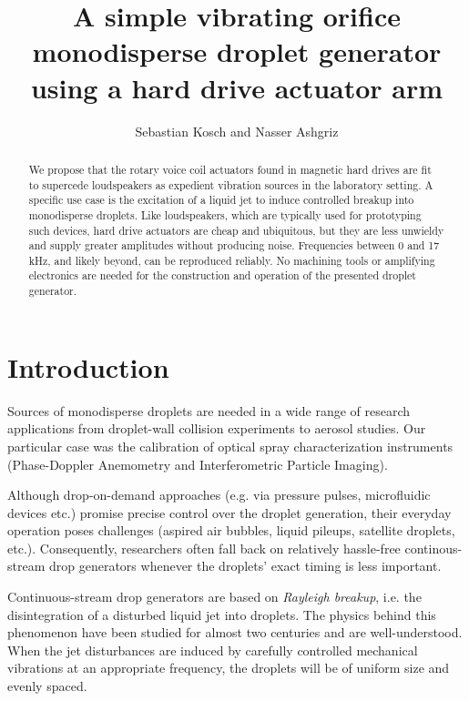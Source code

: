 \documentclass[aip,rsi,reprint,graphicx]{revtex4-1} %
\begin{document}
\title{A simple vibrating orifice monodisperse droplet generator using a hard
drive actuator arm}
\author{Sebastian Kosch and Nasser Ashgriz}
\begin{abstract}
    We propose that the rotary voice coil actuators found in magnetic hard drives are
    fit to supercede loudspeakers as expedient vibration sources in the laboratory setting. A
    specific use case is the excitation of a liquid jet to induce controlled
    breakup into monodisperse droplets. Like loudspeakers, which are typically
    used for prototyping such devices, hard drive actuators are cheap and ubiquitous, but they are less
    unwieldy and supply greater amplitudes without producing noise. Frequencies
    between 0 and 17 kHz, and likely beyond, can be reproduced reliably. No machining
    tools or amplifying electronics are needed for the construction and
    operation of the presented droplet generator.
\end{abstract}
\maketitle
\section{Introduction}
Sources of monodisperse droplets are needed in a wide range of research
applications from droplet-wall collision experiments\cite{Mundo95} to aerosol
studies\cite{Liu74}. Our particular case was the calibration of optical spray
characterization instruments (Phase-Doppler Anemometry and Interferometric
Particle Imaging).

Although drop-on-demand approaches (e.g. via pressure pulses, microfluidic
devices etc.) promise precise control over the droplet
generation, their everyday operation poses challenges (aspired air bubbles,
liquid pileups, satellite droplets, etc.). Consequently, researchers often fall
back on relatively hassle-free continous-stream drop generators whenever the
droplets' exact timing is less important.

Continuous-stream drop generators are based on \emph{Rayleigh breakup},
i.e. the disintegration of a disturbed liquid jet into droplets. The physics
behind this phenomenon have been studied for almost two centuries\cite{Savart33,
Rayleigh79} and are well-understood. When the jet disturbances are induced by
carefully controlled mechanical vibrations at an appropriate frequency, the
droplets will be of uniform size and evenly spaced.
\end{document}
